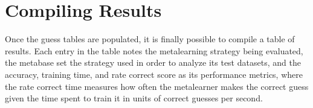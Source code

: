 \section{Compiling Results}
Once the guess tables are populated, it is finally possible to compile a table of results. Each entry in the
table notes the metalearning strategy being evaluated, the metabase set the strategy used in order to
analyze its test datasets, and the accuracy, training time, and rate correct score as its performance
metrics, where the rate correct time measures how often the metalearner makes the correct guess given
the time spent to train it in units of correct guesses per second.
